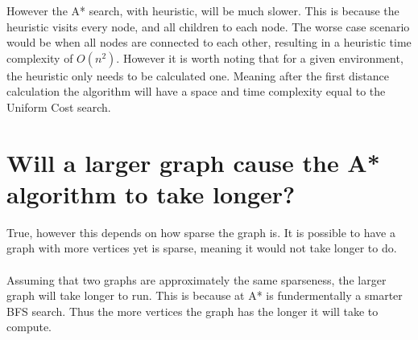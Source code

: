 \documentclass[12pt]{article}
\begin{document}
    However the A* search, with heuristic, will be much slower. This is because the heuristic visits every node, and all children to each node. The worse case scenario would be when all nodes are connected to each other, resulting in a heuristic time complexity of $O(n^2)$. However it is worth noting that for a given environment, the heuristic only needs to be calculated one. Meaning after the first distance calculation the algorithm will have a space and time complexity equal to the Uniform Cost search.

    \section{Will a larger graph cause the A* algorithm to take longer?}

    True, however this depends on how sparse the graph is. It is possible to have a graph with more vertices yet is sparse, meaning it would not take longer to do.\\
    \\
    Assuming that two graphs are approximately the same sparseness, the larger graph will take longer to run. This is because at A* is fundermentally a smarter BFS search. Thus the more vertices the graph has the longer it will take to compute.
\end{document}
